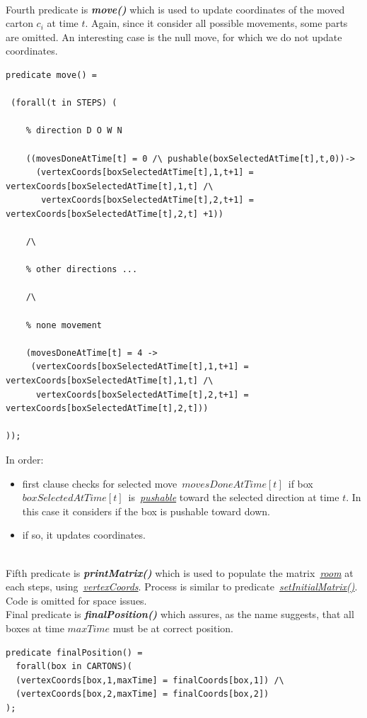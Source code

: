 \documentclass[headinclude, footinclude, abstract=on]{scrarticle}
\begin{document}
\\Fourth predicate is \textbf{\textit{move()}} which is used to update coordinates of the moved carton $c_i$ at time $t$. Again, since it consider all possible movements, some parts are omitted. An interesting case is the null move, for which we do not update coordinates.
\begin{verbatim}
predicate move() = 
  
 (forall(t in STEPS) (

    % direction D O W N

    ((movesDoneAtTime[t] = 0 /\ pushable(boxSelectedAtTime[t],t,0))->  
      (vertexCoords[boxSelectedAtTime[t],1,t+1] = vertexCoords[boxSelectedAtTime[t],1,t] /\  
       vertexCoords[boxSelectedAtTime[t],2,t+1] = vertexCoords[boxSelectedAtTime[t],2,t] +1))  
    
    /\

    % other directions ...

    /\

    % none movement

    (movesDoneAtTime[t] = 4 ->  
     (vertexCoords[boxSelectedAtTime[t],1,t+1] = vertexCoords[boxSelectedAtTime[t],1,t] /\   
      vertexCoords[boxSelectedAtTime[t],2,t+1] = vertexCoords[boxSelectedAtTime[t],2,t]))  
        
));
\end{verbatim}
In order:
\begin{itemize}
    \item first clause checks for selected move~$movesDoneAtTime[t]$~if box~$boxSelectedAtTime[t]$~is~\hyperref[sec:pushable]{\textit{pushable}} toward the selected direction at time $t$. In this case it considers if the box is pushable toward down. 
    \item if so, it updates coordinates. 
\end{itemize}
\\Fifth predicate is \textbf{\textit{printMatrix()}} which is used to populate the matrix~\hyperref[sec:def]{\textit{room}} at each steps, using~\hyperref[sec:def]{\textit{vertexCoords}}. Process is similar to predicate~\hyperref[sec:start]{\textit{setInitialMatrix()}}. Code is omitted for space issues.
\\Final predicate is \textbf{\textit{finalPosition()}} which assures, as the name suggests, that all boxes at time $maxTime$ must be at correct position.
\begin{verbatim}
predicate finalPosition() =
  forall(box in CARTONS)(
  (vertexCoords[box,1,maxTime] = finalCoords[box,1]) /\
  (vertexCoords[box,2,maxTime] = finalCoords[box,2]) 
);
\end{verbatim}
\end{document}
